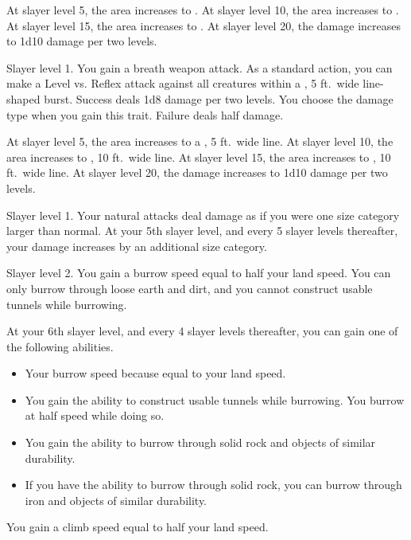     At slayer level 5, the area increases to \areamed.
    At slayer level 10, the area increases to \arealarge.
    At slayer level 15, the area increases to \areahuge.
    At slayer level 20, the damage increases to 1d10 damage per two levels.

    \featpre Slayer level 1.
    \featben You gain a breath weapon attack.
    As a standard action, you can make a Level vs. Reflex attack against all creatures within a \areamed, 5 ft.\ wide line-shaped burst.
    Success deals 1d8 damage per two levels.
    You choose the damage type when you gain this trait.
    Failure deals half damage.

    At slayer level 5, the area increases to a \arealarge, 5 ft.\ wide line.
    At slayer level 10, the area increases to \arealarge, 10 ft.\ wide line.
    At slayer level 15, the area increases to \areahuge, 10 ft.\ wide line.
    At slayer level 20, the damage increases to 1d10 damage per two levels.

    \featpre Slayer level 1.
    \featben Your natural attacks deal damage as if you were one size category larger than normal.
    At your 5th slayer level, and every 5 slayer levels thereafter, your damage increases by an additional size category.

    \featpre Slayer level 2.
    \featben You gain a burrow speed equal to half your land speed.
    You can only burrow through loose earth and dirt, and you cannot construct usable tunnels while burrowing.

    At your 6th slayer level, and every 4 slayer levels thereafter, you can gain one of the following abilities.
    \begin{itemize}
        \item Your burrow speed because equal to your land speed.
        \item You gain the ability to construct usable tunnels while burrowing.
            You burrow at half speed while doing so.
        \item You gain the ability to burrow through solid rock and objects of similar durability.
        \item If you have the ability to burrow through solid rock, you can burrow through iron and objects of similar durability.
    \end{itemize}

    \featben You gain a climb speed equal to half your land speed.


